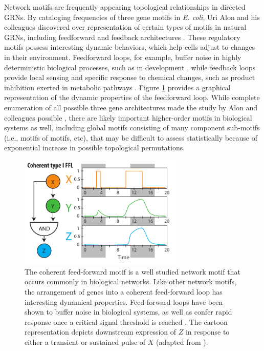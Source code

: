 Network motifs are frequently appearing topological relationships in directed GRNs. By cataloging frequencies of three gene motifs in \textit{E. coli}, Uri Alon and his colleagues discovered over representation of certain types of motifs in natural GRNs, including feedforward and feedback architectures \cite{milo_network_2002}. These regulatory motifs possess interesting dynamic behaviors, which help cells adjust to changes in their environment. Feedforward loops, for example, buffer noise in highly deterministic biological processes, such as in development \cite{mangan_structure_2003,levine_gene_2005}, while feedback loops provide local sensing and specific response to chemical changes, such as product inhibition exerted in metabolic pathways \cite{neidhardt_escherichia_1996}. Figure \ref{fig:chap1:ffl} provides a graphical representation of the dynamic properties of the feedforward loop. While complete enumeration of all possible three gene architectures made the study by Alon and colleagues possible \cite{milo_network_2002}, there are likely important higher-order motifs in biological systems as well, including global motifs consisting of many component sub-motifs (i.e., motifs of motifs, etc), that may be difficult to assess statistically because of exponential increase in possible topological permutations.

\begin{figure}[h!]
    \centering
    \includegraphics[width=0.7\textwidth]{figures/ffl}
    \caption[Network motifs: the coherent feed-forward loop]{
    The coherent feed-forward motif is a well studied network motif that occurs commonly in biological networks. Like other network motifs, the arrangement of genes into a coherent feed-forward loop has interesting dynamical properties. Feed-forward loops have been shown to buffer noise in biological systems, as well as confer rapid response once a critical signal threshold is reached \cite{mangan_structure_2003}. The cartoon representation depicts downstream expression of $Z$ in response to either a transient or sustained pulse of $X$ (adapted from \cite{mangan_structure_2003}).
}
    \label{fig:chap1:ffl}
\end{figure}

